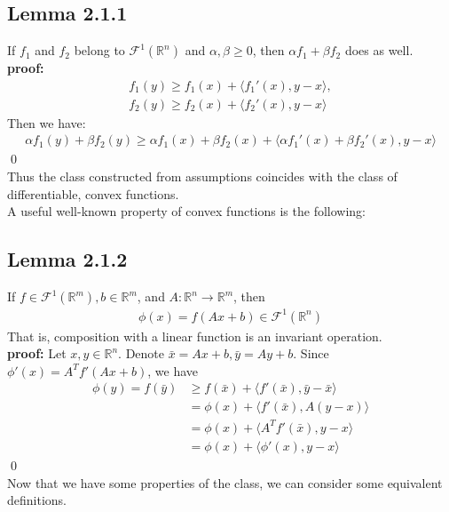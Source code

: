 \documentclass[12pt,a4paper]{article}
\begin{document}
	\subsection*{Lemma 2.1.1}\label{lem211}
	If $f_1$ and $f_2$ belong to $\mathcal{F}^1(\mathbb{R}^n)$ and $\alpha, \beta \geq 0$, then $\alpha f_1 + \beta f_2$ does as well. \\
	\textbf{proof:}
	\begin{align*}
		f_1(y) \geq f_1(x) + \langle f_1'(x), y-x \rangle, \\
		f_2(y) \geq f_2(x) + \langle f_2'(x), y - x \rangle 
	\end{align*}
	Then we have:
	\begin{align*}
		\alpha f_1(y) + \beta f_2(y) \geq \alpha f_1(x) + \beta f_2(x) + \langle \alpha f_1'(x) + \beta f_2'(x), y - x \rangle  
	\end{align*}
	\qed \\
	Thus the class constructed from assumptions coincides with the class of differentiable, convex functions. \\
	A useful well-known property of convex functions is the following:
	\subsection*{Lemma 2.1.2}\label{lem212}
	If $f \in \mathcal{F}^1(\mathbb{R}^m), b \in \mathbb{R}^m$, and $A: \mathbb{R}^n \rightarrow \mathbb{R}^m$, then
	\begin{align*}
		\phi(x) = f(Ax + b) \in \mathcal{F}^1(\mathbb{R}^n)
	\end{align*} 
	That is, composition with a linear function is an invariant operation. \\
	\textbf{proof:} Let $x, y \in \mathbb{R}^n$. Denote $\bar{x} = Ax + b, \bar{y} = Ay + b$. Since $\phi'(x) = A^Tf'(Ax + b)$, we have
	\begin{align*}
		\phi(y) = f(\bar{y}) &\geq f(\bar{x}) + \langle f'(\bar{x}), \bar{y} - \bar{x} \rangle \\
		&= \phi(x) + \langle f'(\bar{x}), A(y - x) \rangle \\
		&= \phi(x) + \langle A^Tf'(\bar{x}), y - x \rangle \\
		&= \phi(x) + \langle \phi'(x), y - x \rangle 
	\end{align*}
	\qed \\
	Now that we have some properties of the class, we can consider some equivalent definitions. 
\end{document}
